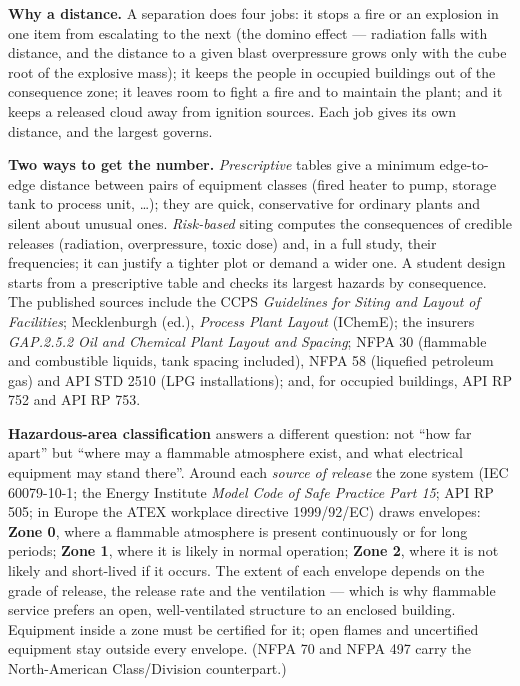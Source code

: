 \documentclass[11pt,a4paper]{article}
\begin{document}
\textbf{Why a distance.} A separation does four jobs: it stops a fire or
an explosion in one item from escalating to the next (the domino effect
--- radiation falls with distance, and the distance to a given blast
overpressure grows only with the cube root of the explosive mass); it
keeps the people in occupied buildings out of the consequence zone; it
leaves room to fight a fire and to maintain the plant; and it keeps a
released cloud away from ignition sources. Each job gives its own
distance, and the largest governs.

\textbf{Two ways to get the number.} \emph{Prescriptive} tables give a
minimum edge-to-edge distance between pairs of equipment classes (fired
heater to pump, storage tank to process unit, \ldots); they are quick,
conservative for ordinary plants and silent about unusual ones.
\emph{Risk-based} siting computes the consequences of credible releases
(radiation, overpressure, toxic dose) and, in a full study, their
frequencies; it can justify a tighter plot or demand a wider one. A
student design starts from a prescriptive table and checks its largest
hazards by consequence. The published sources include the CCPS
\emph{Guidelines for Siting and Layout of Facilities}; Mecklenburgh
(ed.), \emph{Process Plant Layout} (IChemE); the insurers\textquotesingle{}
\emph{GAP.2.5.2 Oil and Chemical Plant Layout and Spacing}; NFPA 30
(flammable and combustible liquids, tank spacing included), NFPA 58
(liquefied petroleum gas) and API STD 2510 (LPG installations); and, for
occupied buildings, API RP 752 and API RP 753.

\textbf{Hazardous-area classification} answers a different question:
not ``how far apart'' but ``where may a flammable atmosphere exist, and
what electrical equipment may stand there''. Around each \emph{source of
release} the zone system (IEC 60079-10-1; the Energy Institute
\emph{Model Code of Safe Practice Part 15}; API RP 505; in Europe the
ATEX workplace directive 1999/92/EC) draws envelopes: \textbf{Zone 0},
where a flammable atmosphere is present continuously or for long
periods; \textbf{Zone 1}, where it is likely in normal operation;
\textbf{Zone 2}, where it is not likely and short-lived if it occurs.
The extent of each envelope depends on the grade of release, the release
rate and the ventilation --- which is why flammable service prefers an
open, well-ventilated structure to an enclosed building. Equipment inside
a zone must be certified for it; open flames and uncertified equipment
stay outside every envelope. (NFPA 70 and NFPA 497 carry the
North-American Class/Division counterpart.)
\end{document}
